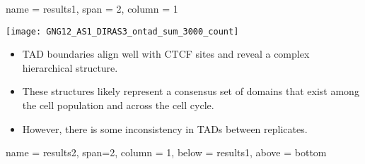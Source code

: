\documentclass[a0paper, portrait]{baposter}
\begin{document}
\begin{poster}
{}




 {
	name = results1, span = 2, column = 1}{ 
\begin{center}
\texttt{[image: GNG12\_AS1\_DIRAS3\_ontad\_sum\_3000\_count]}
\end{center}

\begin{itemize}[leftmargin=*]
\item TAD boundaries\textsuperscript{\cite{An2019}} align well with CTCF sites and reveal a complex hierarchical structure.
\item These structures likely represent a consensus set of domains that exist among the cell population and across the cell cycle.
\item However, there is some inconsistency in TADs between replicates.
\end{itemize}

}

 {
	name = results2, span=2, column = 1, 
	below = results1, above = bottom}{

}
\end{poster}
\end{document}
